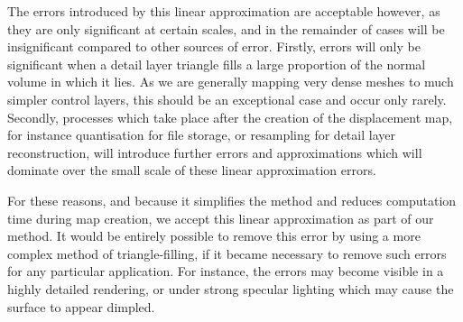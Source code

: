 The errors introduced by this linear approximation are acceptable however, as they are only significant at certain scales, and in the remainder of cases will be insignificant compared to other sources of error. Firstly, errors will only be significant when a detail layer triangle fills a large proportion of the normal volume in which it lies. As we are generally mapping very dense meshes to much simpler control layers, this should be an exceptional case and occur only rarely. Secondly, processes which take place after the creation of the displacement map, for instance quantisation for file storage, or resampling for detail layer reconstruction, will introduce further errors and approximations which will dominate over the small scale of these linear approximation errors.

For these reasons, and because it simplifies the method and reduces computation time during map creation, we accept this linear approximation as part of our method. It would be entirely possible to remove this error by using a more complex method of triangle-filling, if it became necessary to remove such errors for any particular application. For instance, the errors may become visible in a highly detailed rendering, or under strong specular lighting which may cause the surface to appear dimpled.


